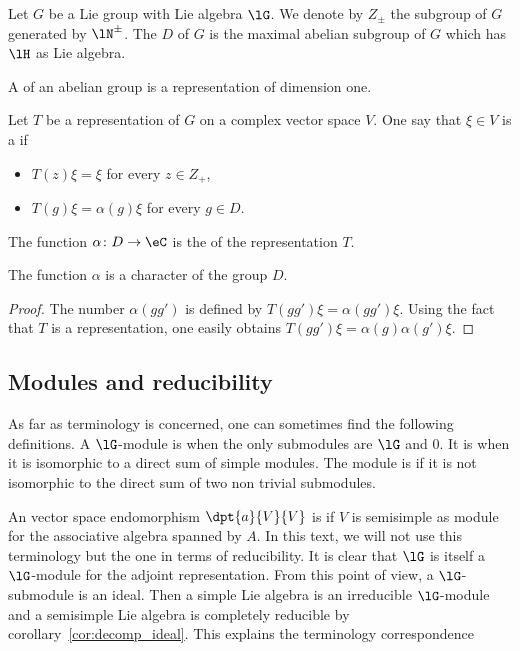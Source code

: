 Let $G$ be a Lie group with Lie algebra $\lG$. We denote by $Z_{\pm}$ the subgroup of $G$ generated by $\lN^{\pm}$. The  $D$ of $G$ is the maximal abelian subgroup of $G$ which has $\lH$ as Lie algebra.

A  of an abelian group is a representation of dimension one.

Let $T$ be a representation of $G$ on a complex vector space $V$. One say that $\xi\in V$ is a  if
\begin{itemize}
	\item $T(z)\xi=\xi$ for every $z\in Z_+$,
	\item $T(g)\xi=\alpha(g)\xi$ for every $g\in D$.
\end{itemize}
The function $\alpha\colon D\to \eC$ is the  of the representation $T$.

\begin{lemma}
	The function $\alpha$ is a character of the group $D$.
\end{lemma}

\begin{proof}
	The number $\alpha(gg')$ is defined by $T(gg')\xi=\alpha(gg')\xi$. Using the fact that $T$ is a representation, one easily obtains $T(gg')\xi=\alpha(g)\alpha(g')\xi$.
\end{proof}

\subsection{Modules and reducibility}

As far as terminology is concerned, one can sometimes find the following definitions. A $\lG$-module is  when the only submodules are $\lG$ and $0$. It is  when it is isomorphic to a direct sum of simple modules. The module is  if it is not isomorphic to the direct sum of two non trivial submodules.

An vector space endomorphism $\dpt{a}{V}{V}$ is  if $V$ is semisimple as module for the associative algebra spanned by $A$. In this text, we will not use this terminology but the one in terms of reducibility. It is clear that $\lG$ is itself a $\lG$-module for the adjoint representation. From this point of view, a $\lG$-submodule is an ideal. Then a simple Lie algebra is an irreducible $\lG$-module and a semisimple Lie algebra is completely reducible by corollary~\ref{cor:decomp_ideal}. This explains the terminology correspondence

